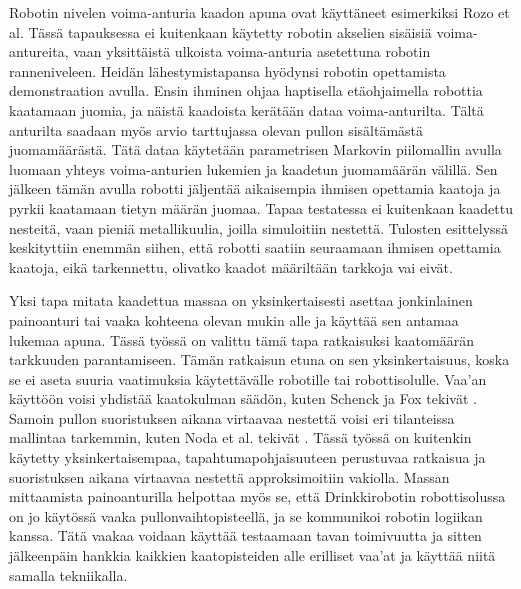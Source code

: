 Robotin nivelen voima-anturia kaadon apuna ovat käyttäneet esimerkiksi Rozo et al. Tässä tapauksessa ei kuitenkaan käytetty robotin akselien sisäisiä voima-antureita, vaan yksittäistä ulkoista voima-anturia asetettuna robotin ranneniveleen. Heidän lähestymistapansa hyödynsi robotin opettamista demonstraation avulla. Ensin ihminen ohjaa haptisella etäohjaimella robottia kaatamaan juomia, ja näistä kaadoista kerätään dataa voima-anturilta. Tältä anturilta saadaan myös arvio tarttujassa olevan pullon sisältämästä juomamäärästä. Tätä dataa käytetään parametrisen Markovin piilomallin avulla luomaan yhteys voima-anturien lukemien ja kaadetun juomamäärän välillä. Sen jälkeen tämän avulla robotti jäljentää aikaisempia ihmisen opettamia kaatoja ja pyrkii kaatamaan tietyn määrän juomaa. Tapaa testatessa ei kuitenkaan kaadettu nesteitä, vaan pieniä metallikuulia, joilla simuloitiin nestettä. Tulosten esittelyssä keskityttiin enemmän siihen, että robotti saatiin seuraamaan ihmisen opettamia kaatoja, eikä tarkennettu, olivatko kaadot määriltään tarkkoja vai eivät. \cite{Rozo2013}

Yksi tapa mitata kaadettua massaa on yksinkertaisesti asettaa jonkinlainen painoanturi tai vaaka kohteena olevan mukin alle ja käyttää sen antamaa lukemaa apuna. Tässä työssä on valittu tämä tapa ratkaisuksi kaatomäärän tarkkuuden parantamiseen. Tämän ratkaisun etuna on sen yksinkertaisuus, koska se ei aseta suuria vaatimuksia käytettävälle robotille tai robottisolulle. Vaa'an käyttöön voisi yhdistää kaatokulman säädön, kuten Schenck ja Fox tekivät \cite{Schenck2016}. Samoin pullon suoristuksen aikana virtaavaa nestettä voisi eri tilanteissa mallintaa tarkemmin, kuten Noda et al. tekivät \cite{Noda2008}. Tässä työssä on kuitenkin käytetty yksinkertaisempaa, tapahtumapohjaisuuteen perustuvaa ratkaisua ja suoristuksen aikana virtaavaa nestettä approksimoitiin vakiolla. Massan mittaamista painoanturilla helpottaa myös se, että Drinkkirobotin robottisolussa on jo käytössä vaaka pullonvaihtopisteellä, ja se kommunikoi robotin logiikan kanssa. Tätä vaakaa voidaan käyttää testaamaan tavan toimivuutta ja sitten jälkeenpäin hankkia kaikkien kaatopisteiden alle erilliset vaa'at ja käyttää niitä samalla tekniikalla.

